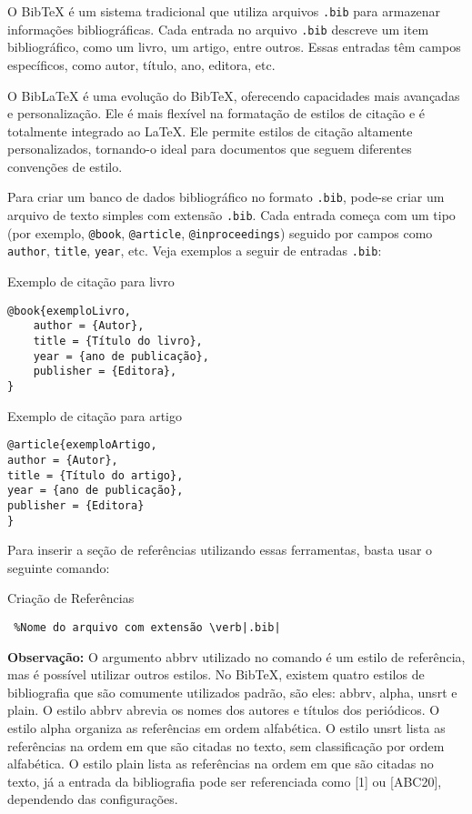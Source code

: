 \noindent O BibTeX é um sistema tradicional que utiliza arquivos \verb|.bib| para armazenar informações bibliográficas. Cada entrada no arquivo \verb|.bib| descreve um item bibliográfico, como um livro, um artigo, entre outros. Essas entradas têm campos específicos, como autor, título, ano, editora, etc.

\noindent O BibLaTeX é uma evolução do BibTeX, oferecendo capacidades mais avançadas e personalização. Ele é mais flexível na formatação de estilos de citação e é totalmente integrado ao \LaTeX{}. Ele permite estilos de citação altamente personalizados, tornando-o ideal para documentos que seguem diferentes convenções de estilo.

\noindent Para criar um banco de dados bibliográfico no formato \verb|.bib|, pode-se criar um arquivo de texto simples com extensão \verb|.bib|. Cada entrada começa com um tipo (por exemplo, \verb|@book|, \verb|@article|, \verb|@inproceedings|) seguido por campos como \verb|author|, \verb|title|, \verb|year|, etc. Veja exemplos a seguir de entradas \verb|.bib|:

\begin{trailer}{Exemplo de citação para livro}
\begin{verbatim} 
@book{exemploLivro,
    author = {Autor},
    title = {Título do livro},
    year = {ano de publicação},
    publisher = {Editora},
} \end{verbatim}
\end{trailer}

\begin{trailer}{Exemplo de citação para artigo}
\begin{verbatim} 
@article{exemploArtigo,
author = {Autor},
title = {Título do artigo},
year = {ano de publicação},
publisher = {Editora}
} \end{verbatim}
\end{trailer}

\noindent Para inserir a seção de referências utilizando essas ferramentas, basta usar o seguinte comando: 

\begin{trailer}{Criação de Referências}
\begin{verbatim} 
 %Nome do arquivo com extensão \verb|.bib|

\end{verbatim}
\end{trailer}

\noindent \textbf{Observação:} O argumento abbrv utilizado no comando \verb|| é um estilo de referência, mas é possível utilizar outros estilos. No BibTeX, existem quatro estilos de bibliografia que são comumente utilizados padrão, são eles: abbrv, alpha, unsrt e plain. O estilo abbrv abrevia os nomes dos autores e títulos dos periódicos. O estilo alpha organiza as referências em ordem alfabética. O estilo unsrt lista as referências na ordem em que são citadas no texto, sem classificação por ordem alfabética. O estilo plain lista as referências na ordem em que são citadas no texto, já a entrada da bibliografia pode ser referenciada como [1] ou [ABC20], dependendo das configurações.

